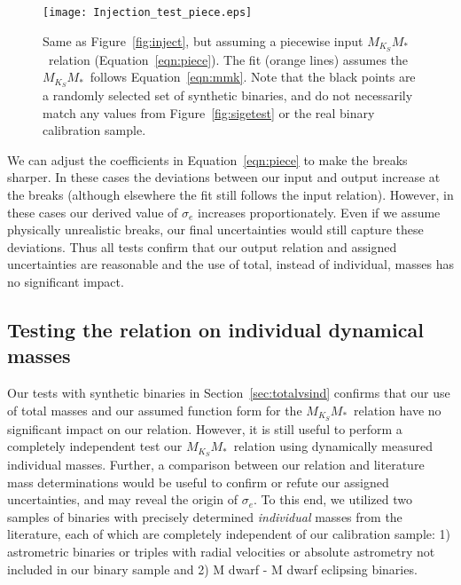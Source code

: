 \documentclass[twocolumn]{aastex62}
\newcommand{\mmk}{$M_{K_S}$\textendash$M_*$}
\begin{document}
\begin{figure}[h]
\begin{center}
\texttt{[image: Injection\_test\_piece.eps]}
\caption{Same as Figure~\ref{fig:inject}, but assuming a piecewise input \mmk\ relation (Equation~\ref{eqn:piece}). The fit (orange lines) assumes the \mmk\ follows Equation~\ref{eqn:mmk}. Note that the black points are a randomly selected set of synthetic binaries, and do not necessarily match any values from Figure~\ref{fig:sigetest} or the real binary calibration sample. }
\label{fig:piece}
\end{center}
\end{figure}

We can adjust the coefficients in Equation~\ref{eqn:piece} to make the breaks sharper. In these cases the deviations between our input and output increase at the breaks (although elsewhere the fit still follows the input relation). However, in these cases our derived value of $\sigma_e$ increases proportionately. Even if we assume physically unrealistic breaks, our final uncertainties would still capture these deviations. Thus all tests confirm that our output relation and assigned uncertainties are reasonable and the use of total, instead of individual, masses has no significant impact. 

 \subsection{Testing the relation on individual dynamical masses}\label{sec:test}
 
Our tests with synthetic binaries in Section~\ref{sec:totalvsind} confirms that our use of total masses and our assumed function form for the \mmk\ relation have no significant impact on our relation. However, it is still useful to perform a completely independent test our \mmk\ relation using dynamically measured individual masses. Further, a comparison between our relation and literature mass determinations would be useful to confirm or refute our assigned uncertainties, and may reveal the origin of $\sigma_e$. To this end, we utilized two samples of binaries with precisely determined {\it individual} masses from the literature, each of which are completely independent of our calibration sample: 1) astrometric binaries or triples with radial velocities or absolute astrometry not included in our binary sample and 2) M dwarf - M dwarf eclipsing binaries.
  
\end{document}
